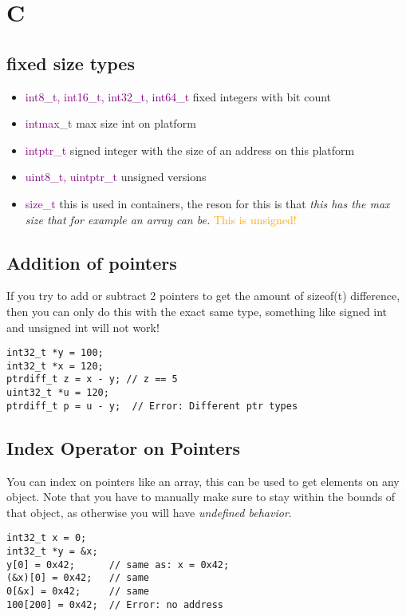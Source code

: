 \documentclass[main.tex,fontsize=8pt,paper=a4,paper=portrait,DIV=calc,]{scrartcl}
\begin{document}
\tableofcontents

\newcommand{\TITLE}{Bsys2}
\newcommand{\AUTHOR}{Fabio Lenherr}
\setcounter{tocdepth}{1}

\lstset{
    language=C,
    style=code,
}

\section{C}

\subsection{fixed size types}
\begin{itemize}
\item \textcolor{purple}{int8\_t, int16\_t, int32\_t, int64\_t}\newline
  fixed integers with bit count
\item \textcolor{purple}{intmax\_t} max size int on platform
\item \textcolor{purple}{intptr\_t} signed integer with the size of an address on this platform
\item \textcolor{purple}{uint8\_t, uintptr\_t} unsigned versions
\item \textcolor{purple}{size\_t} \newline
  this is used in containers, the reson for this is that \emph{this has the max size that for example an array can be.}\newline
  \textcolor{orange}{This is unsigned!}
\end{itemize}

\subsection{Addition of pointers}
If you try to add or subtract 2 pointers to get the amount of sizeof(t) difference, then you can only do this with the exact same type, something like signed int and unsigned int will not work!\newline
\begin{lstlisting}
int32_t *y = 100;
int32_t *x = 120;
ptrdiff_t z = x - y; // z == 5
uint32_t *u = 120;  
ptrdiff_t p = u - y;  // Error: Different ptr types
\end{lstlisting}

\subsection{Index Operator on Pointers}
You can index on pointers like an array, this can be used to get elements on any object.\newline
Note that you have to manually make sure to stay within the bounds of that object, as otherwise you will have \emph{undefined behavior}.\newline
\begin{lstlisting}
int32_t x = 0;
int32_t *y = &x;
y[0] = 0x42;      // same as: x = 0x42;
(&x)[0] = 0x42;   // same
0[&x] = 0x42;     // same
100[200] = 0x42;  // Error: no address
\end{lstlisting}
\end{document}
